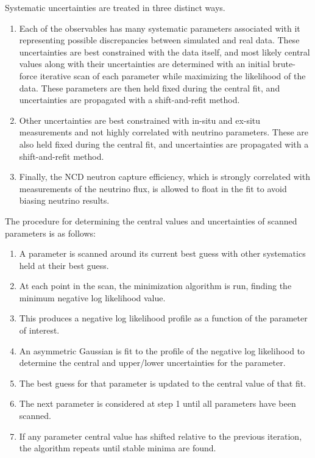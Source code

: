 Systematic uncertainties are treated in three distinct ways.
\begin{enumerate}
\item Each of the observables has many systematic parameters associated with it representing possible discrepancies between simulated and real data. These uncertainties are best constrained with the data itself, and most likely central values along with their uncertainties are determined with an initial brute-force iterative scan of each parameter while maximizing the likelihood of the data. These parameters are then held fixed during the central fit, and uncertainties are propagated with a shift-and-refit method.
\item Other uncertainties are best constrained with in-situ and ex-situ measurements and not highly correlated with neutrino parameters. These are also held fixed during the central fit, and uncertainties are propagated with a shift-and-refit method.
\item Finally, the NCD neutron capture efficiency, which is strongly correlated with measurements of the neutrino flux, is allowed to float in the fit to avoid biasing neutrino results.
\end{enumerate}

The procedure for determining the central values and uncertainties of scanned parameters is as follows:
\begin{enumerate}
\item A parameter is scanned around its current best guess with other systematics held at their best guess.
\item At each point in the scan, the minimization algorithm is run, finding the minimum negative log likelihood value.
\item This produces a negative log likelihood profile as a function of the parameter of interest.
\item An asymmetric Gaussian is fit to the profile of the negative log likelihood to determine the central and upper/lower uncertainties for the parameter.
\item The best guess for that parameter is updated to the central value of that fit.
\item The next parameter is considered at step 1 until all parameters have been scanned.
\item If any parameter central value has shifted relative to the previous iteration, the algorithm repeats until stable minima are found.
\end{enumerate}

